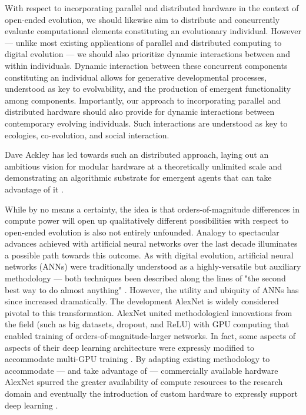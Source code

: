 With respect to incorporating parallel and distributed hardware in the context of open-ended evolution, we should likewise aim to distribute and concurrently evaluate computational elements constituting an evolutionary individual.
However --- unlike most existing applications of parallel and distributed computing to digital evolution --- we should also prioritize dynamic interactions between and within individuals.
Dynamic interaction between these concurrent components constituting an individual allows for generative developmental processes, understood as key to evolvability, and the production of emergent functionality among components.
Importantly, our approach to incorporating parallel and distributed hardware should also provide for dynamic interactions between contemporary evolving individuals.
Such interactions are understood as key to ecologies, co-evolution, and social interaction. %

Dave Ackley has led towards such an distributed approach, laying out an ambitious vision for modular hardware at a theoretically unlimited scale \citep{ackley2011pursue} and demonstrating an algorithmic substrate for emergent agents that can take advantage of it \citep{ackley2018digital}.

While by no means a certainty, the idea is that orders-of-magnitude differences in compute power will open up qualitatively different possibilities with respect to open-ended evolution is also not entirely unfounded.
Analogy to spectacular advances achieved with artificial neural networks over the last decade illuminates a possible path towards this outcome.
As with digital evolution, artificial neural networks (ANNs) were traditionally understood as a highly-versatile but auxiliary methodology --- both techniques been described along the lines of "the second best way to do almost anything" \citep{miaoulis2008intelligent, eiben2015introduction}.
However, the utility and ubiquity of ANNs has since increased dramatically.
The development AlexNet is widely considered pivotal to this transformation.
AlexNet united methodological innovations from the field (such as big datasets, dropout, and ReLU) with GPU computing that enabled training of orders-of-magnitude-larger networks.
In fact, some aspects of aspects of their deep learning architecture were expressly modified to accommodate multi-GPU training \citep{krizhevsky2012imagenet}.
By adapting existing methodology to accommodate --- and take advantage of --- commercially available hardware AlexNet spurred the greater availability of compute resources to the research domain and eventually the introduction of custom hardware to expressly support deep learning \citep{jouppi2017datacenter}.

